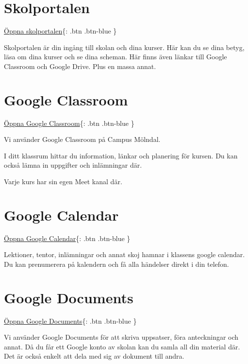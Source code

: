 \hypertarget{skolportalen}{%
\section{Skolportalen}\label{skolportalen}}

\href{https://www.molndal.se/skolportal?authmech=Personal\%20och\%20elever}{Öppna
skolportalen}\{: .btn .btn-blue \}

Skolportalen är din ingång till skolan och dina kurser. Här kan du se
dina betyg, läsa om dina kurser och se dina scheman. Här finns även
länkar till Google Classroom och Google Drive. Plus en massa annat.

\hypertarget{google-classroom}{%
\section{Google Classroom}\label{google-classroom}}

\href{https://classroom.google.com/}{Öppna Google Classroom}\{: .btn
.btn-blue \}

Vi använder Google Classroom på Campus Mölndal.

I ditt klassrum hittar du information, länkar och planering för kursen.
Du kan också lämna in uppgifter och inlämningar där.

Varje kurs har sin egen Meet kanal där.

\hypertarget{google-calendar}{%
\section{Google Calendar}\label{google-calendar}}

\href{https://calendar.google.com/}{Öppna Google Calendar}\{: .btn
.btn-blue \}

Lektioner, tentor, inlämningar och annat skoj hamnar i klassens google
calendar. Du kan prenumerera på kalendern och få alla händelser direkt i
din telefon.

\hypertarget{google-documents}{%
\section{Google Documents}\label{google-documents}}

\href{https://docs.google.com/}{Öppna Google Documents}\{: .btn
.btn-blue \}

Vi använder Google Documents för att skriva uppsatser, föra anteckningar
och annat. Då du får ett Google konto av skolan kan du samla all din
material där. Det är också enkelt att dela med sig av dokument till
andra.

